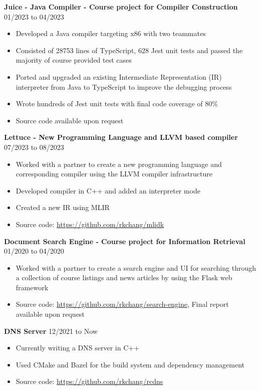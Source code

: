 \documentclass[10pt]{article}
\begin{document}
\textbf{Juice - Java Compiler - Course project for Compiler Construction} \hfill 01/2023 to 04/2023
\begin{itemize}[noitemsep]
    \item Developed a Java compiler targeting x86 with two teammates
    \item Consisted of 28753 lines of TypeScript, 628 Jest unit tests and passed the majority of course provided test cases
    \item Ported and upgraded an existing Intermediate Representation (IR) interpreter from Java to TypeScript to improve the debugging process
    \item Wrote hundreds of Jest unit tests with final code coverage of 80\%
    \item Source code available upon request
\end{itemize}

\textbf{Lettuce - New Programming Language and LLVM based compiler} \hfill 07/2023 to 08/2023
\begin{itemize}[noitemsep]
    \item Worked with a partner to create a new programming language and corresponding compiler using the LLVM compiler infrastructure
    \item Developed compiler in C++ and added an interpreter mode
    \item Created a new IR using MLIR
    \item Source code: \url{https://github.com/rkchang/mlidk}
\end{itemize}

\textbf{Document Search Engine - Course project for Information Retrieval} \hfill 01/2020 to 04/2020
\begin{itemize}[noitemsep]
    \item Worked with a partner to create a search engine and UI for searching through a collection of course listings and news articles by using the Flask web framework
    \item Source code: \url{https://github.com/rkchang/search-engine}, Final report available upon request
\end{itemize}

\textbf{DNS Server} \hfill 12/2021 to Now
\begin{itemize}[noitemsep]
    \item Currently writing a DNS server in C++
    \item Used CMake and Bazel for the build system and dependency management
    \item Source code: \url{https://github.com/rkchang/rcdns}
\end{itemize}
\end{document}
